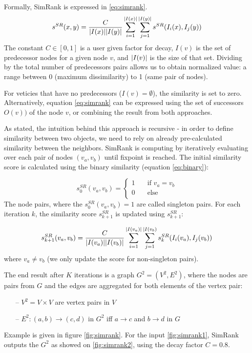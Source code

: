 Formally, SimRank is expressed in \ref{eq:simrank}.
\begin{equation}
	s^{SR}(x,y) = \dfrac{C}{\arrowvert I(x)\arrowvert \arrowvert I(y)\arrowvert}
	\sum_{i=1}^{\arrowvert I(x)\arrowvert}
	\sum_{j=1}^{\arrowvert I(y)\arrowvert}s^{SR}(I_{i}(x), I_{j}(y))
	\label{eq:simrank}
\end{equation}
The constant $C \in [0,1]$ is a user given factor for decay, $I(v)$ is the set of predecessor nodes for a given node $v$, 
and $\arrowvert I(v)\arrowvert$ is the size of that set.
Dividing by the total number of predecessors pairs allows us to obtain normalized value: 
a range between 0 (maximum dissimilarity) to 1 (same pair of nodes). 

For veticies that have no predecessors ($I(v)=\emptyset$), the similarity is set to zero.
Alternatively, equation \ref{eq:simrank} can be expressed using the set of successors $O(v))$ of the node $v$,
or combining the result from both approaches.

As stated, the intuition behind this approach is recursive - 
in order to define similarity between two objects, we need to rely on already pre-calculated similarity between the neighbors.
SimRank is computing by iteratively evaluating over each pair of nodes $(v_{a},v_{b})$ until fixpoint is reached. 
The initial similarity score is  calculated using the binary similarity (equation \ref{eq:binary}):

\begin{equation}
	s_{0}^{SR}(v_{a},v_{b}) = \begin{cases}
	1  & \quad \text{if } v_{a}=v_{b} \\
	0  & \quad \text{else }\\
	\end{cases}
\end{equation}
The node pairs, where the $s_{0}^{SR}(v_{a},v_{b})=1$ are called singleton pairs.
For each iteration $k$, the similarity score $s_{k+1}^{SR}$ is updated using $s_{k+1}^{SR}$:

\begin{equation}
	s_{k+1}^{SR}(v_{a},v_{b})= \dfrac{C}{\arrowvert I(v_{a})\arrowvert \arrowvert I(v_{b})\arrowvert}
	\sum_{i=1}^{\arrowvert I(v_{a})\arrowvert}\sum_{j=1}^{\arrowvert I(v_{b})}s_{k}^{SR}(I_{i}(v_{a}), I_{j}(v_{b}))
\end{equation}
where $v_{a}\neq v_{b}$ (we only update the score for non-singleton pairs).

The end result after $K$ iterations is a graph $G^{2} = (V^{2},E^{2})$, where the nodes are pairs from $G$
and the edges are aggregated for both elements of the vertex pair:
\begin{itemize}
	\item[--] $V^{2} = V\times V$ are vertex pairs in $V$
	\item[--] $E^{2}:(a,b) \rightarrow (c,d)$ in $G^{2}$ iff $a\rightarrow c$ and $b\rightarrow d$ in $G$
\end{itemize}
Example is given in figure \ref{fig:simrank}. For the input \ref{fig:simrank1}, SimRank outputs the $G^{2}$ as showed on \ref{fig:simrank2}, using the decay factor $C=0.8$.

